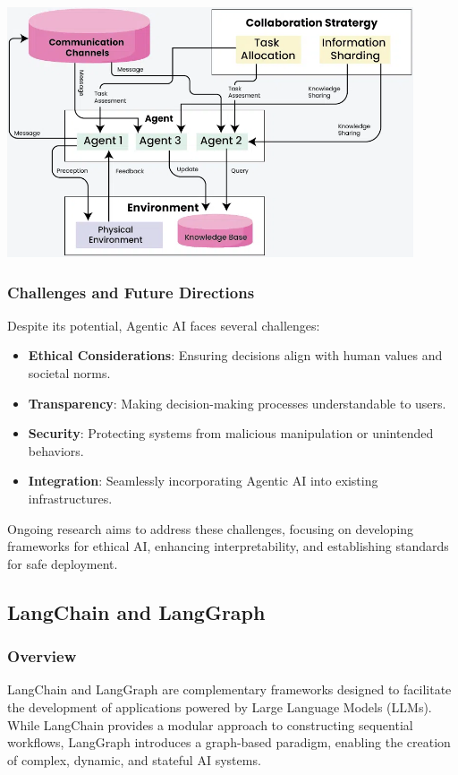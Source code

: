\begin{center}
    \centering
    \includegraphics[width=0.9\textwidth]{Images/multi_agent_system.png}
     \cite{multi_agent_system}
    \label{fig:multi_agent_system}
\end{center}

\subsubsection{Challenges and Future Directions}
Despite its potential, Agentic AI faces several challenges:

\begin{itemize}
    \item \textbf{Ethical Considerations}: Ensuring decisions align with human values and societal norms.
    \item \textbf{Transparency}: Making decision-making processes understandable to users.
    \item \textbf{Security}: Protecting systems from malicious manipulation or unintended behaviors.
    \item \textbf{Integration}: Seamlessly incorporating Agentic AI into existing infrastructures.
\end{itemize}

Ongoing research aims to address these challenges, focusing on developing frameworks for ethical AI, enhancing interpretability, and establishing standards for safe deployment.

\subsection{LangChain and LangGraph}

\subsubsection{Overview}
LangChain and LangGraph are complementary frameworks designed to facilitate the development of applications powered by Large Language Models (LLMs). While LangChain provides a modular approach to constructing sequential workflows, LangGraph introduces a graph-based paradigm, enabling the creation of complex, dynamic, and stateful AI systems.

